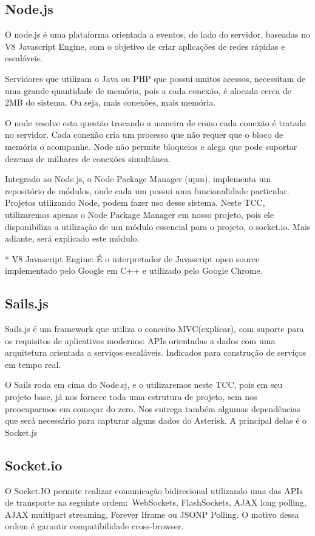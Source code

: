 \documentclass[12pt,a4paper,oneside]{report}
\begin{document}
\subsection{Node.js}
O node.js é uma plataforma orientada a eventos, do lado do servidor, baseadas no V8 Javascript Engine, com o objetivo de criar aplicações de redes rápidas e escaláveis. 

Servidores que utilizam o Java ou PHP que possui muitos acessos, necessitam de uma grande quantidade de memória, pois a cada conexão, é alocada cerca de 2MB do sistema. Ou seja, mais conexões, mais memória. 

O node resolve esta questão trocando a maneira de como cada conexão é tratada no servidor. Cada conexão cria um processo que não requer que o bloco de memória o acompanhe. Node não permite bloqueios e alega que pode suportar dezenas de milhares de conexões simultânea.

Integrado ao Node.js, o Node Package Manager (npm), implementa um repositório de módulos, onde cada um possui uma funcionalidade particular.  Projetos utilizando Node, podem fazer uso desse sistema.
Neste TCC, utilizaremos apenas o Node Package Manager em nosso projeto, pois ele disponibiliza a utilização de um módulo essencial para o projeto, o socket.io. Mais adiante, será explicado este módulo. 

* V8 Javascript Engine: É o interpretador de Javascript open source implementado pelo Google em C++ e utilizado pelo Google Chrome.

\subsection{Sails.js}
Sails.js é um framework que utiliza o conceito MVC(explicar), com suporte para os requisitos de aplicativos modernos: APIs orientadas a dados com uma arquitetura orientada a serviços escaláveis. Indicados para construção de serviços em tempo real. 

O Sails roda em cima do Node.sj, e o utilizaremos neste TCC, pois em seu projeto base, já nos fornece toda uma estrutura de projeto, sem nos preocuparmos em começar do zero. Nos entrega também algumas dependências que será necessário para capturar alguns dados do Asterisk. A principal delas é o Socket.js 

\subsection{Socket.io}
O Socket.IO permite realizar comunicação bidirecional utilizando uma das APIs de transporte na seguinte ordem: WebSockets, FlashSockets, AJAX long polling, AJAX multipart streaming, Forever Iframe ou JSONP Polling. O motivo dessa ordem é garantir compatibilidade cross-browser.
\end{document}
